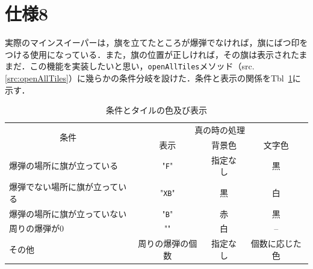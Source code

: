 \documentclass[a4j,11pt]{jsarticle}
\newcommand{\srcref}[1]{src. \ref{#1}}
\newcommand{\tabref}[1]{Tbl\ \ref{#1}}
\begin{document}
\section*{仕様8}
\setcounter{section}{8}\label{sec:仕様8}
\setcounter{subsection}{0}
実際のマインスイーパーは，旗を立てたところが爆弾でなければ，旗にばつ印をつける使用になっている．また，旗の位置が正しければ，その旗は表示されたままだ．この機能を実装したいと思い，\verb|openAllTiles|メソッド（\srcref{src:openAllTiles}）に幾らかの条件分岐を設けた．条件と表示の関係を\tabref{tbl:条件とタイルの色及び表示}に示す．
\begin{table}[h]
    \centering
    \caption{条件とタイルの色及び表示}
    \label{tbl:条件とタイルの色及び表示}
    \begin{tabular}{l|ccc}
        \hline
        \multicolumn{1}{c|}{\multirow{2}{*}{条件}} & \multicolumn{3}{c}{真の時の処理}                             \\
        \cline{2-4}
                                                   & 表示                             & 背景色   & 文字色         \\
        \hline
        爆弾の場所に旗が立っている                 & "\verb|F|"                       & 指定なし & 黒             \\
        爆弾でない場所に旗が立っている             & "\verb|XB|"                      & 黒       & 白             \\
        爆弾の場所に旗が立っていない               & "\verb|B|"                       & 赤       & 黒             \\
        周りの爆弾が0                              & ""                               & 白       & --             \\
        その他                                     & 周りの爆弾の個数                 & 指定なし & 個数に応じた色 \\
        \hline
    \end{tabular}
\end{table}
\newpage
\end{document}
